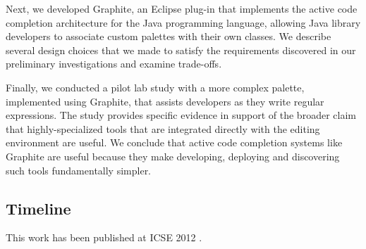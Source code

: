 \begin{contribution}
Next, we developed Graphite, an Eclipse plug-in that implements the active code completion architecture for the Java programming language, allowing Java library developers to associate custom palettes with their own classes. We describe several design choices that we made to satisfy the requirements discovered in our preliminary investigations and examine trade-offs. 
\end{contribution}

\begin{contribution}
Finally, we conducted a pilot lab study with a more complex palette, implemented using Graphite, that assists developers as they write regular expressions. The study provides specific evidence in support of the broader claim that highly-specialized tools that are integrated directly with the editing environment are  useful. We conclude that active code completion systems like Graphite are useful because they make developing, deploying and discovering such tools fundamentally simpler.
\end{contribution}


\subsection{Timeline}
This work has been published at ICSE 2012 \cite{Omar:2012:ACC:2337223.2337324}.%


